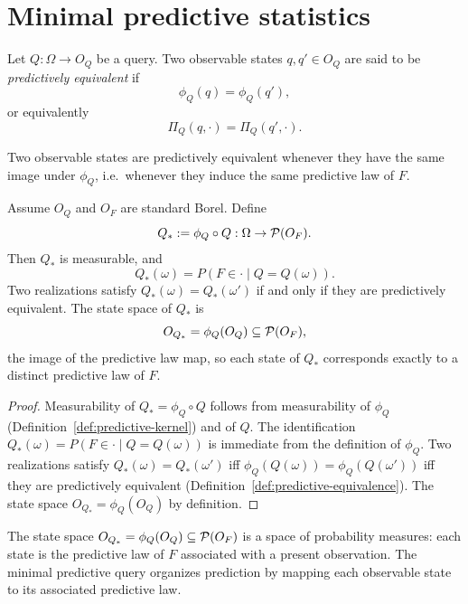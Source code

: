 \bigskip

\section{Minimal predictive statistics}\label{sec:minimal-predictive}

\begin{definition}\label{def:predictive-equivalence}
Let $Q:\Omega\to O_Q$ be a query.  Two observable states
$q,q'\in O_Q$ are said to be \emph{predictively equivalent} if
\[
\phi_Q(q)=\phi_Q(q'),
\]
or equivalently
\[
\Pi_Q(q,\cdot)=\Pi_Q(q',\cdot).
\]
\end{definition}

Two observable states are predictively equivalent whenever they have
the same image under $\phi_Q$, i.e.\ whenever they induce the same
predictive law of $F$.

\begin{theorem}\label{thm:minimal-predictive-query}
Assume $O_Q$ and $O_F$ are standard Borel.  Define
\[
Q_* := \phi_Q \circ Q : \Omega \to \mathcal{P}(O_F).
\]
Then $Q_*$ is measurable, and
\[
Q_*(\omega) = P(F\in\cdot\mid Q=Q(\omega)).
\]
Two realizations satisfy $Q_*(\omega)=Q_*(\omega')$ if and only if
they are predictively equivalent.  The state space of $Q_*$ is
\[
O_{Q_*} = \phi_Q(O_Q) \subseteq \mathcal{P}(O_F),
\]
the image of the predictive law map, so each state of $Q_*$
corresponds exactly to a distinct predictive law of $F$.
\end{theorem}

\begin{proof}
Measurability of $Q_*=\phi_Q\circ Q$ follows from measurability of
$\phi_Q$ (Definition~\ref{def:predictive-kernel}) and of $Q$.  The
identification $Q_*(\omega)=P(F\in\cdot\mid Q=Q(\omega))$ is immediate
from the definition of $\phi_Q$.  Two realizations satisfy
$Q_*(\omega)=Q_*(\omega')$ iff $\phi_Q(Q(\omega))=\phi_Q(Q(\omega'))$
iff they are predictively equivalent
(Definition~\ref{def:predictive-equivalence}).  The state space
$O_{Q_*}=\phi_Q(O_Q)$ by definition.
\end{proof}

\begin{remark}
The state space $O_{Q_*}=\phi_Q(O_Q)\subseteq\mathcal{P}(O_F)$ is a space
of probability measures: each state is the predictive law of $F$
associated with a present observation.  The minimal predictive query
organizes prediction by mapping each observable state to its
associated predictive law.
\end{remark}

